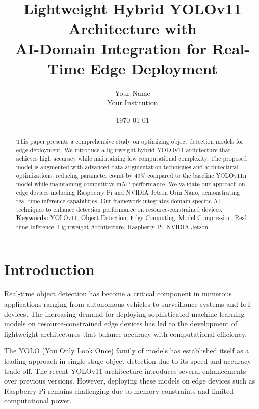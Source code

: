 \documentclass[11pt,a4paper]{article}
\title{\textbf{Lightweight Hybrid YOLOv11 Architecture with \\ AI-Domain Integration for Real-Time Edge Deployment}}
\author{Your Name \\ Your Institution}
\date{\today}
\begin{document}

\maketitle

\begin{abstract}
\noindent
This paper presents a comprehensive study on optimizing object detection models for edge deployment. 
We introduce a lightweight hybrid YOLOv11 architecture that achieves high accuracy while maintaining 
low computational complexity. The proposed model is augmented with advanced data augmentation techniques 
and architectural optimizations, reducing parameter count by 49\% compared to the baseline YOLOv11n model 
while maintaining competitive mAP performance. We validate our approach on edge devices including 
Raspberry Pi and NVIDIA Jetson Orin Nano, demonstrating real-time inference capabilities. 
Our framework integrates domain-specific AI techniques to enhance detection performance on resource-constrained devices.
\\

\noindent
\textbf{Keywords:} YOLOv11, Object Detection, Edge Computing, Model Compression, Real-time Inference, 
Lightweight Architecture, Raspberry Pi, NVIDIA Jetson
\end{abstract}

\newpage
\tableofcontents
\newpage


\section{Introduction}
\label{sec:intro}

Real-time object detection has become a critical component in numerous applications ranging from 
autonomous vehicles to surveillance systems and IoT devices. The increasing demand for deploying 
sophisticated machine learning models on resource-constrained edge devices has led to the development 
of lightweight architectures that balance accuracy with computational efficiency.

The YOLO (You Only Look Once) family of models has established itself as a leading approach in 
single-stage object detection due to its speed and accuracy trade-off. The recent YOLOv11 architecture 
introduces several enhancements over previous versions. However, deploying these models on edge devices 
such as Raspberry Pi remains challenging due to memory constraints and limited computational power.
\end{document}
